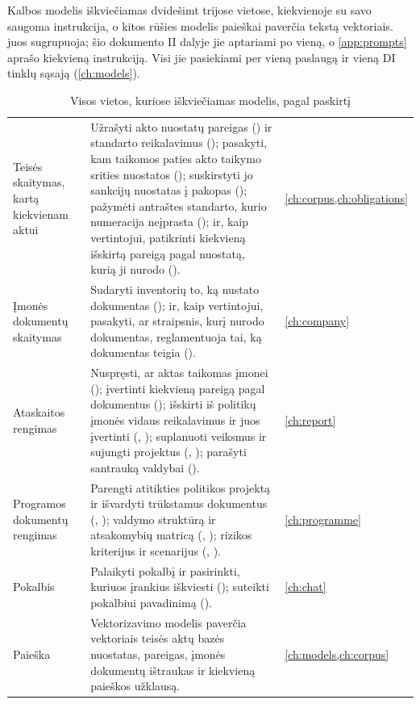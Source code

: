 Kalbos modelis iškviečiamas dvidešimt trijose vietose, kiekvienoje su savo saugoma
instrukcija, o kitos rūšies modelis paieškai paverčia tekstą vektoriais.
 juos sugrupuoja; šio dokumento II dalyje jie aptariami po vieną, o
\cref{app:prompts} aprašo kiekvieną instrukciją.
Visi jie pasiekiami per vieną paslaugą ir vieną DI tinklų sąsają (\cref{ch:models}).

\begin{table}[H]
\caption{Visos vietos, kuriose iškviečiamas modelis, pagal paskirtį}\label{tab:intro:paths}
\begin{tabularx}{\textwidth}{@{}L{31mm}YL{19mm}@{}}
\toprule
{} &  &  \\
\midrule
Teisės skaitymas, kartą kiekvienam aktui &
  Užrašyti akto nuostatų pareigas () ir standarto
  reikalavimus (); pasakyti, kam taikomos paties akto
  taikymo srities nuostatos (); suskirstyti jo sankcijų nuostatas į
  pakopas (); pažymėti antraštes standarto, kurio numeracija
  neįprasta (); ir, kaip vertintojui, patikrinti kiekvieną
  išskirtą pareigą pagal nuostatą, kurią ji nurodo (). &
  \cref{ch:corpus,ch:obligations} \\
Įmonės dokumentų skaitymas &
  Sudaryti inventorių to, ką nustato dokumentas (); ir, kaip
  vertintojui, pasakyti, ar straipsnis, kurį nurodo dokumentas, reglamentuoja tai, ką
  dokumentas teigia (). &
  \cref{ch:company} \\
Ataskaitos rengimas &
  Nuspręsti, ar aktas taikomas įmonei (); įvertinti kiekvieną
  pareigą pagal dokumentus (); išskirti iš politikų įmonės
  vidaus reikalavimus ir juos įvertinti (,
  ); suplanuoti veiksmus ir sujungti projektus
  (, ); parašyti santrauką valdybai
  (). &
  \cref{ch:report} \\
Programos dokumentų rengimas &
  Parengti atitikties politikos projektą ir išvardyti trūkstamus dokumentus
  (, ); valdymo struktūrą ir atsakomybių
  matricą (, ); rizikos kriterijus ir
  scenarijus (, ). &
  \cref{ch:programme} \\
Pokalbis &
  Palaikyti pokalbį ir pasirinkti, kuriuos įrankius iškviesti ();
  suteikti pokalbiui pavadinimą (). &
  \cref{ch:chat} \\
Paieška &
  Vektorizavimo modelis paverčia vektoriais teisės aktų bazės nuostatas, pareigas, įmonės
  dokumentų ištraukas ir kiekvieną paieškos užklausą. &
  \cref{ch:models,ch:corpus} \\
\bottomrule
\end{tabularx}
\end{table}

